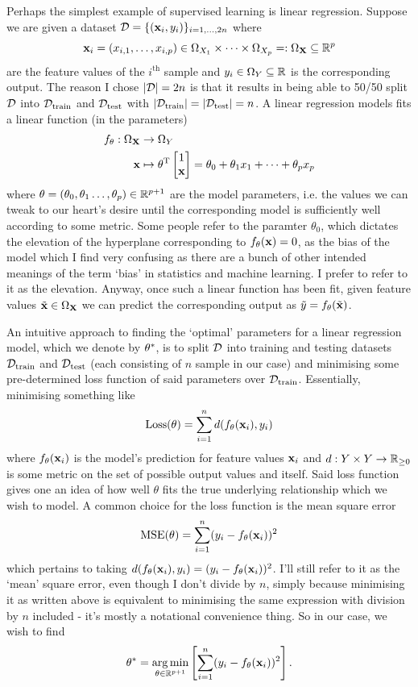 \documentclass[11pt]{article}
\begin{document}
\noindent Perhaps the simplest example of supervised learning is linear regression. Suppose we are given a dataset $\mathcal{D}=\{(\mathbf{x}_i,y_i)\}_{i=1,\dots,2n}$ where
$$
\mathbf{x}_i=(x_{i,1},\dots,x_{i, p})\in \Omega_{X_1}\times\dots\times \Omega_{X_p}=:\Omega_{\mathbf{X}}\subseteq\mathbb{R}^p
$$
are the feature values of the $i^{\text{th}}$ sample and $y_i\in \Omega_{Y}\subseteq\mathbb{R}$ is the corresponding output. The reason I chose $|\mathcal{D}|=2n$ is that it results in being able to 50/50 split $\mathcal{D}$ into $\mathcal{D}_{\text{train}}$ and $\mathcal{D}_{\text{test}}$ with $|\mathcal{D}_{\text{train}}|=|\mathcal{D}_{\text{test}}|=n$. A linear regression models fits a linear function (in the parameters)
\begin{align*}
    f_{\theta}:\Omega_{\mathbf{X}}&\rightarrow \Omega_Y\\
    \mathbf{x}&\mapsto
    \theta^{\text{T}}
    \begin{bmatrix}
        1\\
        \mathbf{x}
    \end{bmatrix}
    =
    \theta_0+\theta_1x_1+\dots+\theta_px_p    
\end{align*}
where $\theta=(\theta_0,\theta_1\dots,\theta_p)\in\mathbb{R}^{p+1}$ are the model parameters, i.e. the values we can tweak to our heart's desire until the corresponding model is sufficiently well according to some metric. Some people refer to the paramter $\theta_0$, which dictates the elevation of the hyperplane corresponding to $f_{\theta}(\mathbf{x})=0$, as the bias of the model which I find very confusing as there are a bunch of other intended meanings of the term `bias' in statistics and machine learning. I prefer to refer to it as the elevation. Anyway, once such a linear function has been fit, given feature values $\tilde{\mathbf{x}}\in\Omega_{\mathbf{X}}$ we can predict the corresponding output as $\tilde{y}=f_{\theta}(\tilde{\mathbf{x}})$.

An intuitive approach to finding the `optimal' parameters for a linear regression model, which we denote by $\theta^{*}$, is to split $\mathcal{D}$ into training and testing datasets $\mathcal{D}_{\text{train}}$ and $\mathcal{D}_{\text{test}}$ (each consisting of $n$ sample in our case) and minimising some pre-determined loss function of said parameters over $\mathcal{D}_{\text{train}}$. Essentially, minimising something like
$$
\text{Loss}(\theta)=\sum_{i=1}^nd(f_{\theta}(\mathbf{x}_i), y_i)
$$
where $f_{\theta}(\mathbf{x}_i)$ is the model's prediction for feature values $\mathbf{x}_i$ and $d:Y\times Y\rightarrow\mathbb{R}_{\geq0}$ is some metric on the set of possible output values and itself. Said loss function gives one an idea of how well $\theta$ fits the true underlying relationship which we wish to model. A common choice for the loss function is the mean square error
$$
\text{MSE}(\theta)=\sum_{i=1}^n(y_i-f_{\theta}(\mathbf{x}_i))^2
$$
which pertains to taking $d(f_{\theta}(\mathbf{x}_i), y_i)=(y_i-f_{\theta}(\mathbf{x}_i))^2$. I'll still refer to it as the `mean' square error, even though I don't divide by $n$, simply because minimising it as written above is equivalent to minimising the same expression with division by $n$ included - it's mostly a notational convenience thing. So in our case, we wish to find
$$
\theta^{*}=\operatorname*{arg\,min}_{\theta\in\mathbb{R}^{p+1}}\left[\sum_{i=1}^n(y_i-f_{\theta}(\mathbf{x}_i))^2\right].
$$
\end{document}

